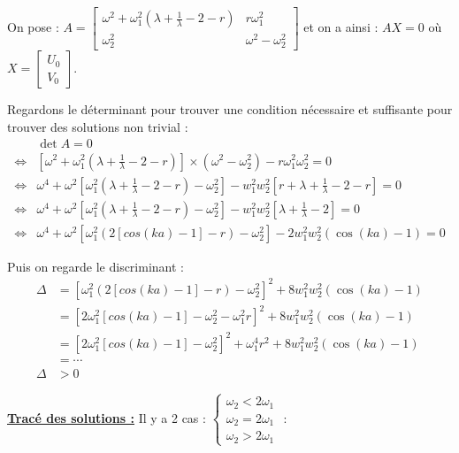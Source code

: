 \documentclass[12pt,a4paper]{article}
\begin{document}
\begin{sol}
\begin{enumerate}
			
			On pose : $A = \left[\begin{matrix}
				\omega^2 + \omega_1^2(\lambda+\frac{1}{\lambda}-2-r) & r\omega_1^2\\
				\omega_2^2 & \omega^2-\omega_2^2
			\end{matrix}\right]$ et on a ainsi : $AX = 0$ où $X = \left[\begin{matrix}
				U_0\\ V_0
			\end{matrix}\right]$.
			
			Regardons le déterminant pour trouver une condition nécessaire et suffisante pour trouver des solutions non trivial :
			\[\begin{aligned}
				&\det A = 0\\
				\iff&\left[\omega^2 + \omega_1^2(\lambda+\frac{1}{\lambda}-2-r)\right]\times (\omega^2-\omega_2^2) - r\omega_1^2\omega_2^2 =0\\
				\iff & \omega^4 + \omega^2 \left[\omega_1^2(\lambda+\frac{1}{\lambda}-2-r)-\omega_2^2\right]-w_1^2w_2^2\left[r+\lambda+\frac{1}{\lambda}-2-r\right] = 0\\
				\iff&\omega^4 + \omega^2 \left[\omega_1^2(\lambda+\frac{1}{\lambda}-2-r)-\omega_2^2\right]-w_1^2w_2^2\left[\lambda+\frac{1}{\lambda}-2\right] = 0\\
				\iff&\omega^4 + \omega^2 \left[\omega_1^2\left(2\left[cos(ka)-1\right]-r\right)-\omega_2^2\right]-2w_1^2w_2^2\left(\cos(ka)-1\right) = 0
			\end{aligned}\]
			
			Puis on regarde le discriminant :
			\[\begin{aligned}
				\Delta &=\left[\omega_1^2\left(2\left[cos(ka)-1\right]-r\right)-\omega_2^2\right]^2+8w_1^2w_2^2\left(\cos(ka)-1\right)\\
				&=\left[2\omega_1^2\left[cos(ka)-1\right]-\omega_2^2-\omega_1^2 r\right]^2+8w_1^2w_2^2\left(\cos(ka)-1\right)\\
				&=\left[2\omega_1^2\left[cos(ka)-1\right]-\omega_2^2\right]^2+\omega_1^4 r^2+8w_1^2w_2^2\left(\cos(ka)-1\right)\\
				&=\cdots\\
				\Delta&>0
			\end{aligned}\]
		\end{enumerate}
		
		\newpage
		
		\textbf{\underline{Tracé des solutions :}} Il y a 2 cas : $\begin{cases}
			\omega_2 <2\omega_1\\
			\omega_2 = 2 \omega_1\\
			\omega_2 > 2\omega_1
		\end{cases}$ :
		

\end{sol}
\end{document}
